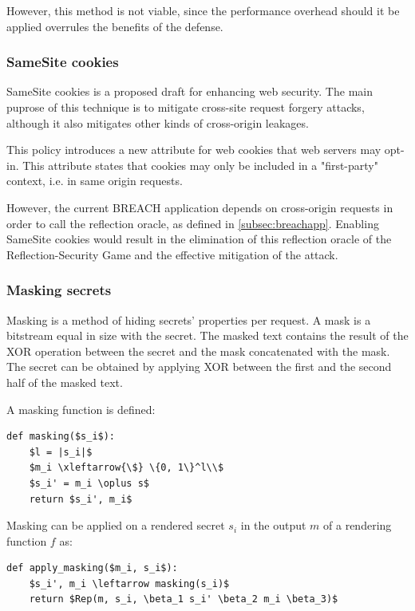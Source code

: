 \documentclass[conference, letterpaper, 10pt]{IEEEtran}
\begin{document}
However, this method is not viable, since the performance overhead should it be
applied overrules the benefits of the defense.

\subsubsection{SameSite cookies}\label{subsec:samesite}
SameSite cookies \cite{c10} is a proposed draft for enhancing web security. The
main puprose of this technique is to mitigate cross-site request forgery
attacks, although it also mitigates other kinds of cross-origin leakages.

This policy introduces a new attribute for web cookies that web servers may
opt-in. This attribute states that cookies may only be included in a
"first-party" context, i.e. in same origin requests.

However, the current BREACH application depends on cross-origin requests in
order to call the reflection oracle, as defined in \ref{subsec:breachapp}.
Enabling SameSite cookies would result in the elimination of this reflection
oracle of the Reflection-Security Game and the effective mitigation of the
attack.

\subsubsection{Masking secrets}\label{subsec:masking}
Masking is a method of hiding secrets' properties per request. A mask is a
bitstream equal in size with the secret. The masked text contains the result of
the XOR operation between the secret and the mask concatenated with the mask.
The secret can be obtained by applying XOR between the first and the second
half of the masked text.

A masking function is defined:

\begin{lstlisting}[texcl,mathescape,basicstyle=\small]
def masking($s_i$):
    $l = |s_i|$
    $m_i \xleftarrow{\$} \{0, 1\}^l\\$
    $s_i' = m_i \oplus s$
    return $s_i', m_i$
\end{lstlisting}

Masking can be applied on a rendered secret $s_i$ in the output $m$ of a
rendering function $f$ as:

\begin{lstlisting}[texcl,mathescape,basicstyle=\small]
def apply_masking($m_i, s_i$):
    $s_i', m_i \leftarrow masking(s_i)$
    return $Rep(m, s_i, \beta_1 s_i' \beta_2 m_i \beta_3)$
\end{lstlisting}
\end{document}
